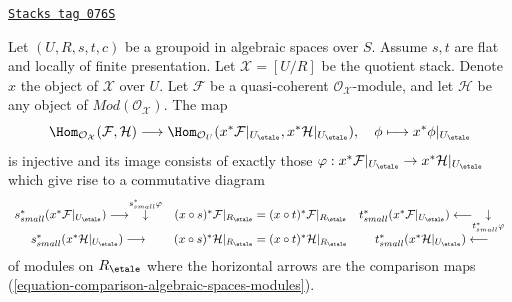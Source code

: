 \begin{lemma}
\label{stacks-sheaves-lemma-map-from-quasi-coherent}
\href{https://stacks.math.columbia.edu/tag/076S}{\texttt{Stacks tag 076S}}

Let $(U, R, s, t, c)$ be a groupoid in algebraic spaces over $S$.
Assume $s, t$ are flat and locally of finite presentation.
Let $\mathcal{X} = [U/R]$ be the quotient stack. Denote
$x$ the object of $\mathcal{X}$ over $U$.
Let $\mathcal{F}$ be a quasi-coherent
$\mathcal{O}_\mathcal{X}$-module, and let $\mathcal{H}$ be any object
of $\textit{Mod}(\mathcal{O}_\mathcal{X})$.
The map
$$
\Hom_{\mathcal{O}_\mathcal{X}}(\mathcal{F}, \mathcal{H})
\longrightarrow
\Hom_{\mathcal{O}_U}(x^*\mathcal{F}|_{U_\etale},
x^*\mathcal{H}|_{U_\etale}),
\quad
\phi \longmapsto x^*\phi|_{U_\etale}
$$
is injective and its image consists of exactly those
$\varphi : x^*\mathcal{F}|_{U_\etale} \to
x^*\mathcal{H}|_{U_\etale}$ which give rise to a commutative
diagram
$$
\begin{array}{ccc}s_{small}^*(x^*\mathcal{F}|_{U_\etale})
\longrightarrow\overset{s_{small}^*\varphi}{\downarrow} & (x \circ s)^*\mathcal{F}|_{R_\etale} =
(x \circ t)^*\mathcal{F}|_{R_\etale} & t_{small}^*(x^*\mathcal{F}|_{U_\etale})
\longleftarrow\underset{t_{small}^*\varphi}{\downarrow} \\ s_{small}^*(x^*\mathcal{H}|_{U_\etale})
\longrightarrow & (x \circ s)^*\mathcal{H}|_{R_\etale} =
(x \circ t)^*\mathcal{H}|_{R_\etale} & t_{small}^*(x^*\mathcal{H}|_{U_\etale})
\longleftarrow\end{array}
$$
of modules on $R_\etale$
where the horizontal arrows are the comparison maps
(\ref{equation-comparison-algebraic-spaces-modules}).
\end{lemma}

